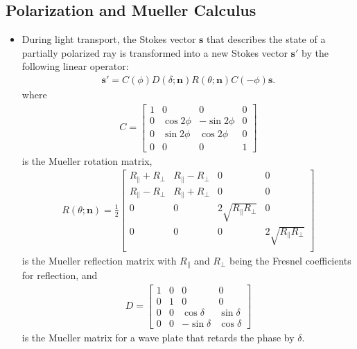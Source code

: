 \documentclass[10pt]{article}
\newcommand{\ve}[1]{\mathbf{#1}}
\begin{document}
    \subsection{Polarization and Mueller Calculus}

    \begin{itemize}
        \item During light transport, the Stokes vector $\ve{s}$ that describes the state of a partially polarized ray is transformed into a new Stokes vector $\ve{s}'$ by the following linear operator:
        \begin{align*}
          \ve{s}' = C(\phi) D(\delta;\ve{n}) R(\theta;\ve{n}) C(-\phi) \ve{s}.
        \end{align*}
        where
        \begin{align*}
          C = \begin{bmatrix}
            1 & 0 & 0 & 0 \\
            0 & \cos 2\phi & -\sin 2\phi & 0 \\
            0 & \sin 2\phi & \cos 2\phi & 0 \\
            0 & 0 & 0 & 1
          \end{bmatrix}          
        \end{align*}
        is the Mueller rotation matrix,
        \begin{align*}
          R(\theta;\ve{n}) = \frac{1}{2} \begin{bmatrix}
            R_{\parallel} + R_{\perp} & R_{\parallel} - R_{\perp} & 0 & 0 \\
            R_{\parallel} - R_{\perp} & R_{\parallel} + R_{\perp} & 0 & 0 \\
            0 & 0 & 2\sqrt{R_{\parallel} R_{\perp}} & 0 \\
            0 & 0 & 0 & 2\sqrt{R_{\parallel} R_{\perp}} \\
          \end{bmatrix}
        \end{align*}
        is the Mueller reflection matrix with $R_{\parallel}$ and $R_{\perp}$ being the Fresnel coefficients for reflection, and
        \begin{align*}
          D = \begin{bmatrix}
            1 & 0 & 0 & 0 \\
            0 & 1 & 0 & 0 \\
            0 & 0 & \cos \delta & \sin\delta \\
            0 & 0 & -\sin\delta & \cos\delta
          \end{bmatrix}          
        \end{align*}
        is the Mueller matrix for a wave plate that retards the phase by $\delta$.


\end{itemize}
\end{document}
